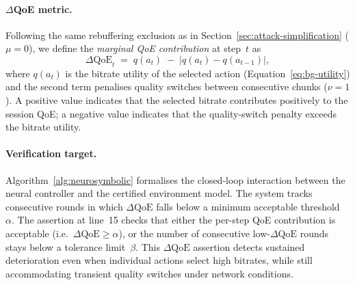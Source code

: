 \documentclass[thesis]{uofithesis} %
\begin{document}
    \paragraph{$\Delta$QoE metric.}
    Following the same rebuffering exclusion as in
    Section~\ref{sec:attack-simplification} ($\mu = 0$), we define the
    \emph{marginal QoE contribution} at step~$t$ as
    \begin{equation}
        \Delta\mathrm{QoE}_t
        \;=\; q(a_t) \;-\; \lvert q(a_t) - q(a_{t-1}) \rvert,
        \label{eq:delta-qoe}
    \end{equation}
    where $q(a_t)$ is the bitrate utility of the selected action
    (Equation~\ref{eq:bg-utility}) and the second term penalises
    quality switches between consecutive chunks ($\nu = 1$).
    A positive value indicates that the selected bitrate contributes
    positively to the session QoE; a negative value indicates that
    the quality-switch penalty exceeds the bitrate utility.

    \paragraph{Verification target.}
    Algorithm~\ref{alg:neurosymbolic} formalises the closed-loop
    interaction between the neural controller and the certified environment
    model.  The system tracks consecutive rounds in which
    $\Delta\text{QoE}$ falls below a minimum acceptable
    threshold~$\alpha$.  The assertion at line~15 checks that either
    the per-step QoE contribution is acceptable
    (i.e.\ $\Delta\text{QoE} \geq \alpha$), or the number of
    consecutive low-$\Delta\text{QoE}$ rounds stays below a tolerance limit~$\beta$.
    This $\Delta\text{QoE}$ assertion detects sustained deterioration
    even when individual actions select high bitrates, while still
    accommodating transient quality switches under network conditions.
\end{document}
